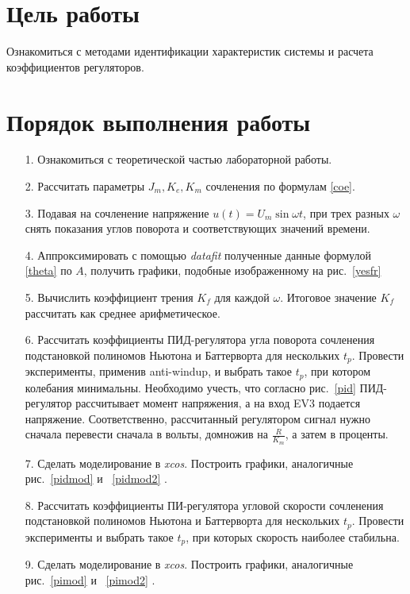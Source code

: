 \section{Цель работы\\}
Ознакомиться с методами идентификации характеристик системы и расчета коэффициентов регуляторов.

\section{Порядок выполнения работы\\}
\begin{enumerate} 
\item[1.] Ознакомиться с теоретической частью лабораторной работы.
\item[2.] Рассчитать параметры $J_m, K_e, K_m$ сочленения по формулам \eqref{coe}.
\item[3.] Подавая на сочленение напряжение  $u(t) = U_m\sin{{\omega}t}$, при трех разных $\omega$ снять показания углов поворота и соответствующих значений времени.
\item[4.] Аппроксимировать с помощью \textit{datafit} полученные данные формулой \eqref{theta} по $A$, получить графики, подобные изображенному на рис.~\ref{yesfr}
\item[5.] Вычислить коэффициент трения $K_f$ для каждой $\omega$. Итоговое значение $K_f$ рассчитать как среднее арифметическое. 
\item[6.] Рассчитать коэффициенты ПИД-регулятора угла поворота сочленения подстановкой полиномов Ньютона и Баттерворта для нескольких $t_p$. Провести эксперименты, применив anti-windup, и выбрать такое $t_p$, при котором колебания минимальны. Необходимо учесть, что согласно рис.~\ref{pid} ПИД-регулятор рассчитывает момент напряжения, а на вход EV3 подается напряжение. Соответственно, рассчитанный регулятором сигнал нужно сначала перевести сначала в вольты, домножив на $\frac{R}{K_m}$, а затем в проценты.
\item[7.] Сделать моделирование в \textit{xcos}. Построить графики, аналогичные рис.~\ref{pidmod} и ~\ref{pidmod2} .
\item[8.] Рассчитать коэффициенты ПИ-регулятора угловой скорости сочленения подстановкой полиномов Ньютона и Баттерворта для нескольких $t_p$. Провести эксперименты и выбрать такое $t_p$, при которых скорость наиболее стабильна.
\item[9.] Сделать моделирование в \textit{xcos}. Построить графики, аналогичные рис.~\ref{pimod} и ~\ref{pimod2} .
 \end{enumerate}
 

